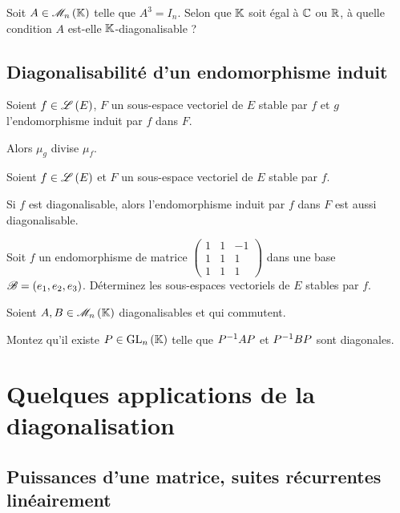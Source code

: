 \begin{exo}
Soit \(A\in\M{n}\) telle que \(A^3=I_n\). Selon que \(\mathbb{K}\) soit égal à \(\mathbb{C}\) ou \(\mathbb{R}\), à quelle condition \(A\) est-elle \(\mathbb{K}\)-diagonalisable ?
\end{exo}

\subsection{Diagonalisabilité d'un endomorphisme induit}

\begin{prop}
Soient \(f\in\mathscr{L}\left(E\right)\), \(F\) un sous-espace vectoriel de \(E\) stable par \(f\) et \(g\) l'endomorphisme induit par \(f\) dans \(F\).

Alors \(\mu_g\) divise \(\mu_f\).
\end{prop}

\begin{cor}
Soient \(f\in\mathscr{L}\left(E\right)\) et \(F\) un sous-espace vectoriel de \(E\) stable par \(f\).

Si \(f\) est diagonalisable, alors l'endomorphisme induit par \(f\) dans \(F\) est aussi diagonalisable.
\end{cor}

\begin{exo}
Soit \(f\) un endomorphisme de matrice \(\begin{pmatrix}
1 & 1 & -1 \\
1 & 1 & 1 \\
1 & 1 & 1
\end{pmatrix}\) dans une base \(\mathscr{B}=\left(e_1,e_2,e_3\right)\). Déterminez les sous-espaces vectoriels de \(E\) stables par \(f\).
\end{exo}

\begin{exo}
Soient \(A,B\in\M{n}\) diagonalisables et qui commutent.

Montez qu'il existe \(P\in\GL{n}\) telle que \(P^{-1} AP\) et \(P^{-1} BP\) sont diagonales.
\end{exo}

\section{Quelques applications de la diagonalisation}

\subsection{Puissances d'une matrice, suites récurrentes linéairement}


